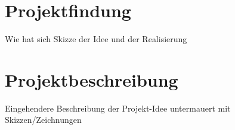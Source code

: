 \chapter{Projektfindung}

    Wie hat sich Skizze der Idee und der Realisierung

\chapter{Projektbeschreibung}
    
    Eingehendere Beschreibung der Projekt-Idee untermauert mit
    Skizzen/Zeichnungen